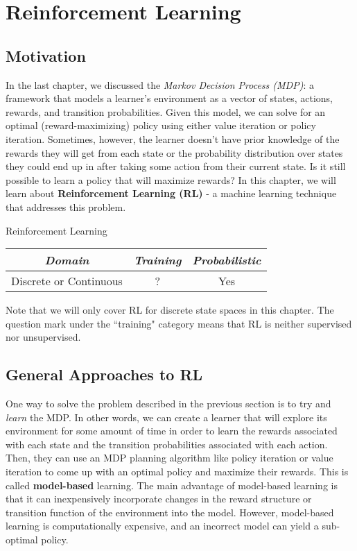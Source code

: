 \chapter{Reinforcement Learning}
\section{Motivation}
In the last chapter, we discussed the \textit{Markov Decision Process (MDP)}: a framework that models a learner's environment as a vector of states, actions, rewards, and transition probabilities. Given this model, we can solve for an optimal (reward-maximizing) policy using either value iteration or policy iteration. Sometimes, however, the learner doesn't have prior knowledge of the rewards they will get from each state or the probability distribution over states they could end up in after taking some action from their current state. Is it still possible to learn a policy that will maximize rewards? In this chapter, we will learn about \textbf{Reinforcement Learning (RL)} - a machine learning technique that addresses this problem.
\begin{mlcube}{Reinforcement Learning}
\begin{center}
    \begin{tabular}{c|c|c}
    \textit{\textbf{Domain}} & \textit{\textbf{Training}} & \textit{\textbf{Probabilistic}} \\
    \hline
    Discrete or Continuous & ? & Yes \\
    \end{tabular}
\end{center}
Note that we will only cover RL for discrete state spaces in this chapter. The question mark under the ``training" category means that RL is neither supervised nor unsupervised. 
\end{mlcube}
\section{General Approaches to RL}
One way to solve the problem described in the previous section is to try and \textit{learn} the MDP. In other words, we can create a learner that will explore its environment for some amount of time in order to learn the rewards associated with each state and the transition probabilities associated with each action. Then, they can use an MDP planning algorithm like policy iteration or value iteration to come up with an optimal policy and maximize their rewards. This is called \textbf{model-based} learning. The main advantage of model-based learning is that it can inexpensively incorporate changes in the reward structure or transition function of the environment into the model. However, model-based learning is computationally expensive, and an incorrect model can yield a sub-optimal policy.\\

